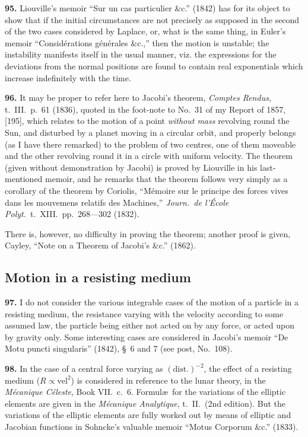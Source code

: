 \documentclass[11pt,a4paper]{article}
\theoremstyle{definition}
\begin{document}
\textbf{95.} Liouville's memoir ``Sur un cas particulier \&c.'' (1842) has for its object to show that if the initial circumstances are not precisely as supposed in the second of the two cases considered by Laplace, or, what is the same thing, in Euler's memoir ``Consid\'erations g\'en\'erales \&c.,'' then the motion is unstable; the instability manifests itself in the usual manner, viz. the expressions for the deviations from the normal positions are found to contain real exponentials which increase indefinitely with the time.

\textbf{96.} It may be proper to refer here to Jacobi's theorem, \textit{Comptes Rendus}, t.~III.~p.~61 (1836), quoted in the foot-note to No.~31 of my Report of 1857, [195], which relates to the motion of a point \textit{without mass} revolving round the Sun, and disturbed by a planet moving in a circular orbit, and properly belongs (as I have there remarked) to the problem of two centres, one of them moveable and the other revolving round it in a circle with uniform velocity. The theorem (given without demonstration by Jacobi) is proved by Liouville in his last-mentioned memoir, and he remarks that the theorem follows very simply as a corollary of the theorem by Coriolis, ``M\'emoire sur le principe des forces vives dans les mouvemens relatifs des Machines,'' \textit{Journ.\ de l'\'Ecole Polyt.}\ t.~XIII.~pp.~268---302 (1832).

There is, however, no difficulty in proving the theorem; another proof is given, Cayley, ``Note on a Theorem of Jacobi's \&c.'' (1862).

\subsection*{Motion in a resisting medium}

\textbf{97.} I do not consider the various integrable cases of the motion of a particle in a resisting medium, the resistance varying with the velocity according to some assumed law, the particle being either not acted on by any force, or acted upon by gravity only. Some interesting cases are considered in Jacobi's memoir ``De Motu puncti singularis'' (1842), \S~6 and 7 (see post, No.~108).

\textbf{98.} In the case of a central force varying as $(\text{dist.})^{-2}$, the effect of a resisting medium ($R \propto \text{vel}^2$) is considered in reference to the lunar theory, in the \textit{M\'ecanique C\'eleste}, Book VII.~c.~6. Formul\ae\ for the variations of the elliptic elements are given in the \textit{M\'ecanique Analytique}, t.~II.~(2nd edition). But the variations of the elliptic elements are fully worked out by means of elliptic and Jacobian functions in Sohncke's valuable memoir ``Motus Corporum \&c.'' (1833).
\end{document}
